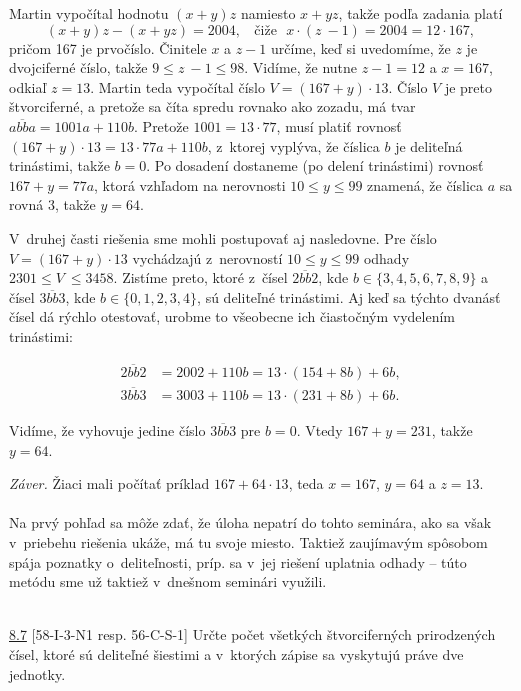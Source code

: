 \rieh Martin vypočítal hodnotu $(x + y)z$ namiesto $x + yz$, takže podľa zadania platí
$$(x + y)z - (x + yz) = 2 004, \ \ \ \ \text{čiže} \ \ \  x \cdot (z~- 1) = 2 004 = 12 \cdot 167,$$
pričom 167 je prvočíslo. Činitele $x$ a $z -1$ určíme, keď si uvedomíme, že $z$ je dvojciferné číslo, takže $9 \leq z~- 1 \leq 98$. Vidíme, že nutne $z - 1 = 12$ a  $x = 167$, odkiaľ $z = 13$. Martin teda vypočítal číslo $V = (167+y)\cdot 13$. Číslo $V$ je preto štvorciferné, a pretože sa číta spredu rovnako ako zozadu, má tvar $\overline{abba} = 1 001a + 110b$. Pretože $1 001 = 13 \cdot 77$, musí platiť rovnosť $(167 + y) \cdot 13 = 13 \cdot 77a + 110b$, z~ktorej vyplýva, že číslica $b$ je deliteľná trinástimi, takže $b = 0$. Po dosadení dostaneme (po delení trinástimi) rovnosť $167 + y = 77a$, ktorá vzhľadom na nerovnosti $10 \leq  y \leq 99$ znamená, že číslica $a$ sa rovná 3, takže $y = 64$.

V~druhej časti riešenia sme mohli postupovať aj nasledovne. Pre číslo $V = (167 + y) \cdot 13$ vychádzajú z~nerovností $10 \leq y \leq 99$ odhady $2301 \leq V~\leq 3 458$. Zistíme
preto, ktoré z~čísel $\overline{2bb2}$, kde $b \in \{3, 4, 5, 6, 7, 8, 9\}$ a čísel $\overline{3bb3}$, kde $b \in \{0, 1, 2, 3, 4\}$, sú deliteľné trinástimi. Aj keď sa týchto dvanásť čísel dá rýchlo otestovať, urobme to všeobecne ich čiastočným vydelením trinástimi:
\vspace{-30pt}
\begin{center}
\begin{align*}
 \overline{2bb2} &= 2 002 + 110b = 13 \cdot (154 + 8b) + 6b,\\
\overline{3bb3} &= 3 003 + 110b = 13 \cdot (231 + 8b) + 6b.
\end{align*}
\end{center}
Vidíme, že vyhovuje jedine číslo $\overline{3bb3}$ pre $b = 0$. Vtedy $167 + y = 231$, takže $y = 64$.

\textit{Záver.} Žiaci mali počítať príklad $167 + 64 \cdot 13$, teda $x = 167$, $y = 64$ a $z = 13$.\\
\\
\kom Na prvý pohľad sa môže zdať, že úloha nepatrí do tohto seminára, ako sa však v~priebehu riešenia ukáže, má tu svoje miesto. Taktiež zaujímavým spôsobom spája poznatky o~deliteľnosti, príp. sa v~jej riešení uplatnia odhady -- túto metódu sme už taktiež v~dnešnom seminári využili.\\
\\
\begin{tcolorbox}[breakable,notitle,boxrule=0pt,colback=light-gray,colframe=light-gray]\ul{8.7} [58-I-3-N1 resp. 56-C-S-1] Určte počet všetkých štvorciferných prirodzených čísel, ktoré sú deliteľné šiestimi a v~ktorých zápise sa vyskytujú práve dve jednotky.

\end{tcolorbox}

